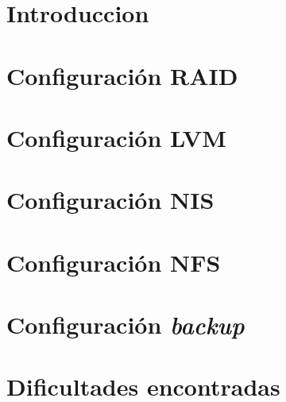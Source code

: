 \documentclass[11pt, spanish, a4paper, hidelinks]{article}
\begin{document}
    \tableofcontents

    \section{Introduccion}
    

    \section{Configuración RAID}
    
    
    \section{Configuración LVM}
    
    
    \section{Configuración NIS}
    
    
    \section{Configuración NFS}
    

    \section{Configuración \textit{backup}}
    

    \section{Dificultades encontradas}
    
\end{document}
